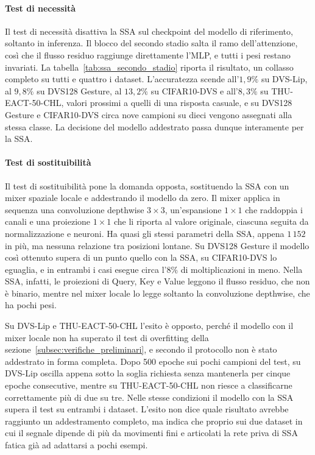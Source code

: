 \paragraph{Test di necessità}
Il test di necessità disattiva la SSA sul checkpoint del modello di riferimento, soltanto in inferenza. Il blocco del secondo stadio salta il ramo dell'attenzione, così che il flusso residuo raggiunge direttamente l'MLP, e tutti i pesi restano invariati. La tabella~\ref{tab:ssa_secondo_stadio} riporta il risultato, un collasso completo su tutti e quattro i dataset. L'accuratezza scende all'$1{,}9\%$ su DVS-Lip, al $9{,}8\%$ su DVS128 Gesture, al $13{,}2\%$ su CIFAR10-DVS e all'$8{,}3\%$ su THU-EACT-50-CHL, valori prossimi a quelli di una risposta casuale, e su DVS128 Gesture e CIFAR10-DVS circa nove campioni su dieci vengono assegnati alla stessa classe. La decisione del modello addestrato passa dunque interamente per la SSA.

\paragraph{Test di sostituibilità}
Il test di sostituibilità pone la domanda opposta, sostituendo la SSA con un mixer spaziale locale e addestrando il modello da zero. Il mixer applica in sequenza una convoluzione depthwise $3\times3$, un'espansione $1\times1$ che raddoppia i canali e una proiezione $1\times1$ che li riporta al valore originale, ciascuna seguita da normalizzazione e neuroni. Ha quasi gli stessi parametri della SSA, appena $1\,152$ in più, ma nessuna relazione tra posizioni lontane. Su DVS128 Gesture il modello così ottenuto supera di un punto quello con la SSA, su CIFAR10-DVS lo eguaglia, e in entrambi i casi esegue circa l'$8\%$ di moltiplicazioni in meno. Nella SSA, infatti, le proiezioni di Query, Key e Value leggono il flusso residuo, che non è binario, mentre nel mixer locale lo legge soltanto la convoluzione depthwise, che ha pochi pesi.

Su DVS-Lip e THU-EACT-50-CHL l'esito è opposto, perché il modello con il mixer locale non ha superato il test di overfitting della sezione~\ref{subsec:verifiche_preliminari}, e secondo il protocollo non è stato addestrato in forma completa. Dopo 500 epoche sui pochi campioni del test, su DVS-Lip oscilla appena sotto la soglia richiesta senza mantenerla per cinque epoche consecutive, mentre su THU-EACT-50-CHL non riesce a classificarne correttamente più di due su tre. Nelle stesse condizioni il modello con la SSA supera il test su entrambi i dataset. L'esito non dice quale risultato avrebbe raggiunto un addestramento completo, ma indica che proprio sui due dataset in cui il segnale dipende di più da movimenti fini e articolati la rete priva di SSA fatica già ad adattarsi a pochi esempi.

